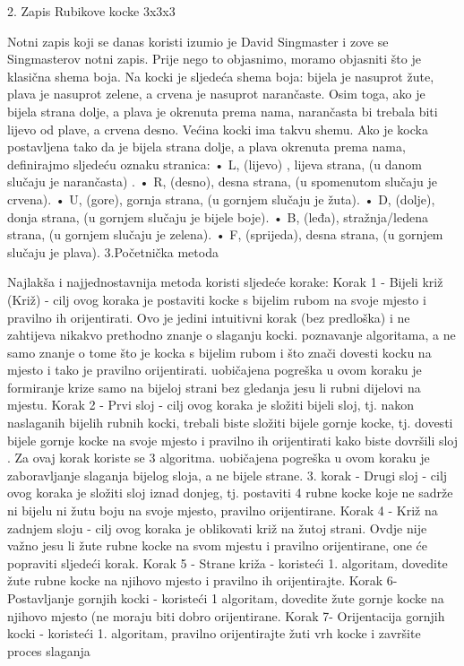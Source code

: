 2. Zapis Rubikove kocke 3x3x3

   Notni zapis koji se danas koristi izumio je David Singmaster i zove se Singmasterov notni zapis. Prije nego to objasnimo, moramo objasniti što je klasična shema boja. Na kocki je sljedeća shema boja: bijela je nasuprot žute, plava je nasuprot zelene, a crvena je nasuprot narančaste. Osim toga, ako je bijela strana dolje, a plava je okrenuta prema nama, narančasta bi trebala biti lijevo od plave, a crvena desno. Većina kocki ima takvu shemu. Ako je kocka postavljena tako da je bijela strana dolje, a plava okrenuta prema nama, definirajmo sljedeću oznaku stranica: • L, (lijevo) , lijeva strana, (u danom slučaju je narančasta) . • R, (desno), desna strana, (u spomenutom slučaju je crvena). • U, (gore), gornja strana, (u gornjem slučaju je žuta). • D, (dolje), donja strana, (u gornjem slučaju je bijele boje). • B, (leđa), stražnja/ledena strana, (u gornjem slučaju je zelena). • F, (sprijeda), desna strana, (u gornjem slučaju je plava).
3.Početnička metoda

Najlakša i najjednostavnija metoda koristi sljedeće korake: Korak 1 - Bijeli križ (Križ) - cilj ovog koraka je postaviti kocke s bijelim rubom na svoje mjesto i pravilno ih orijentirati. Ovo je jedini intuitivni korak (bez predloška) i ne zahtijeva nikakvo prethodno znanje o slaganju kocki. poznavanje algoritama, a ne samo znanje o tome što je kocka s bijelim rubom i što znači dovesti kocku na mjesto i tako je pravilno orijentirati. uobičajena pogreška u ovom koraku je formiranje krize samo na bijeloj strani bez gledanja jesu li rubni dijelovi na mjestu. Korak 2 - Prvi sloj - cilj ovog koraka je složiti bijeli sloj, tj. nakon naslaganih bijelih rubnih kocki, trebali biste složiti bijele gornje kocke, tj. dovesti bijele gornje kocke na svoje mjesto i pravilno ih orijentirati kako biste dovršili sloj . Za ovaj korak koriste se 3 algoritma. uobičajena pogreška u ovom koraku je zaboravljanje slaganja bijelog sloja, a ne bijele strane. 3. korak - Drugi sloj - cilj ovog koraka je složiti sloj iznad donjeg, tj. postaviti 4 rubne kocke koje ne sadrže ni bijelu ni žutu boju na svoje mjesto, pravilno orijentirane. Korak 4 - Križ na zadnjem sloju - cilj ovog koraka je oblikovati križ na žutoj strani. Ovdje nije važno jesu li žute rubne kocke na svom mjestu i pravilno orijentirane, one će popraviti sljedeći korak. Korak 5 - Strane križa - koristeći 1. algoritam, dovedite žute rubne kocke na njihovo mjesto i pravilno ih orijentirajte. Korak 6- Postavljanje gornjih kocki - koristeći 1 algoritam, dovedite žute gornje kocke na njihovo mjesto (ne moraju biti dobro orijentirane. Korak 7- Orijentacija gornjih kocki - koristeći 1. algoritam, pravilno orijentirajte žuti vrh kocke i završite proces slaganja

